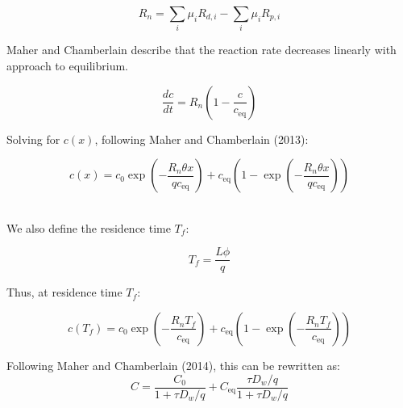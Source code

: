 \begin{tcolorbox}
{\begin{multicols}{2}
\begin{equation}
R_n = \sum_{i} \mu_i R_{d,i} - \sum_{i} \mu_i R_{p,i}
\end{equation}

\end{multicols}

\begin{multicols}{2}

Maher and Chamberlain describe that the reaction rate decreases linearly with approach to equilibrium.

\columnbreak
\begin{equation}
\frac{dc}{dt} = R_n \left( 1 - \frac{c}{c_{\text{eq}}} \right)
\end{equation}

\end{multicols}

Solving for \( c(x) \), following Maher and Chamberlain (2013):

\begin{equation}
c(x) = c_0 \exp\left(-\frac{R_n \theta x}{q c_{\text{eq}}} \right) + c_{\text{eq}} \left( 1 - \exp\left(-\frac{R_n \theta x}{q c_{\text{eq}}} \right) \right)
\end{equation}\\


\begin{multicols}{2}

We also define the residence time \( T_f \):

\columnbreak

\begin{equation}
T_f = \frac{L\phi}{q}
\end{equation}

\end{multicols}

Thus, at residence time \( T_f \):

\begin{equation}
c(T_f) = c_0 \exp\left(-\frac{R_n T_f}{c_{\text{eq}}} \right) + c_{\text{eq}} \left( 1 - \exp\left(-\frac{R_n T_f}{c_{\text{eq}}} \right) \right)
\end{equation}


\begin{multicols}{2}

Following Maher and Chamberlain (2014), this can be rewritten as:
\columnbreak
\begin{equation}
    C =  \frac{C_{\text{0}}}{1 + \tau D_w / q} + C_{\text{eq}} \frac{\tau D_w / q}{1 + \tau D_w / q}
\end{equation}
    

\end{multicols}}
\end{tcolorbox}
